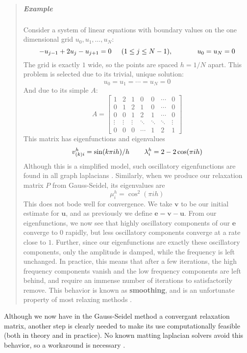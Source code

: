 \begin{quote}
\item
\subparagraph{Example}
Consider a system of linear equations with boundary values on the one dimensional grid $u_0,u_1,\ldots,u_N$:
\[-u_{j-1}+2u_j-u_{j+1}=0\hspace{.2in}(1\leq j\leq N-1),
\hspace{.5in}u_0=u_N=0\]
The grid is exactly $1$ wide, so the points are spaced $h=1/N$ apart.
This problem is selected due to its trivial, unique solution:
\[u_0=u_1=\cdots=u_N=0\]
And due to its simple $A$:
\[A=
\left[\begin{array}{ccccccc}
1 & 2 & 1 & 0 & 0 & \cdots & 0 \\
0 & 1 & 2 & 1 & 0 & \cdots & 0 \\
0 & 0 & 1 & 2 & 1 & \cdots & 0 \\
\vdots & \vdots & \vdots & \ddots & \ddots & \ddots & \vdots \\
0 & 0 & 0 & \cdots & 1 & 2 & 1
\end{array}\right]\]
This matrix has eigenfunctions and eigenvalues
\[v^h_{(k)i}=\sin(k\pi ih)/h\hspace{.3in}
\lambda_i^h=2-2\cos(\pi ih)\]
Although this is a simplified model, such oscillatory eigenfunctions are found in all graph laplacians \cite{lee14}. Similarly, when we produce our relaxation matrix $P$ from Gauss-Seidel, its eigenvalues are
\[\mu_i^h=\cos^2(\pi i h)\]
This does not bode well for convergence. We take $\textbf{v}$ to be our initial estimate for $\textbf{u}$, and as previously we define $\textbf{e}=\textbf{v}-\textbf{u}$. From our eigenfunctions, we now see that highly oscillatory components of our $\textbf{e}$ converge to $0$ rapidly, but less oscillatory components converge at a rate close to $1$. Further, since our eigenfunctions are exactly these oscillatory components, only the amplitude is damped, while the frequency is left unchanged. In practice, this means that after a few iterations, the high frequency components vanish and the low frequency components are left behind, and require an immense number of iterations to satisfactorily remove. This behavior is known as \textbf{smoothing}, and is an unfortunate property of most relaxing methods \cite{briggs87}.
\end{quote}
Although we now have in the Gauss-Seidel method a convergant relaxation matrix, another step is clearly needed to make its use computationally feasible (both in theory and in practice). No known matting laplacian solvers avoid this behavior, so a workaround is necessary \cite{lee14}.